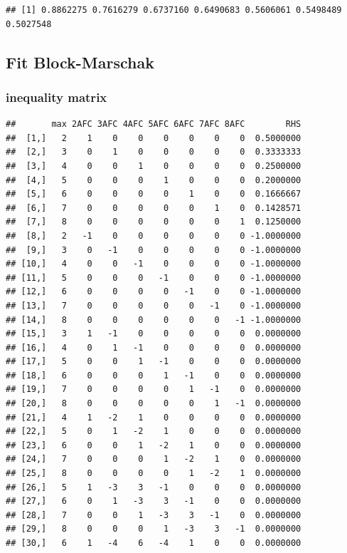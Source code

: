 \documentclass[]{article}
\begin{document}
\begin{verbatim}
## [1] 0.8862275 0.7616279 0.6737160 0.6490683 0.5606061 0.5498489 0.5027548
\end{verbatim}

\subsection{Fit Block-Marschak}\label{fit-block-marschak}

\subsubsection{inequality matrix}\label{inequality-matrix}

\begin{verbatim}
##       max 2AFC 3AFC 4AFC 5AFC 6AFC 7AFC 8AFC        RHS
##  [1,]   2    1    0    0    0    0    0    0  0.5000000
##  [2,]   3    0    1    0    0    0    0    0  0.3333333
##  [3,]   4    0    0    1    0    0    0    0  0.2500000
##  [4,]   5    0    0    0    1    0    0    0  0.2000000
##  [5,]   6    0    0    0    0    1    0    0  0.1666667
##  [6,]   7    0    0    0    0    0    1    0  0.1428571
##  [7,]   8    0    0    0    0    0    0    1  0.1250000
##  [8,]   2   -1    0    0    0    0    0    0 -1.0000000
##  [9,]   3    0   -1    0    0    0    0    0 -1.0000000
## [10,]   4    0    0   -1    0    0    0    0 -1.0000000
## [11,]   5    0    0    0   -1    0    0    0 -1.0000000
## [12,]   6    0    0    0    0   -1    0    0 -1.0000000
## [13,]   7    0    0    0    0    0   -1    0 -1.0000000
## [14,]   8    0    0    0    0    0    0   -1 -1.0000000
## [15,]   3    1   -1    0    0    0    0    0  0.0000000
## [16,]   4    0    1   -1    0    0    0    0  0.0000000
## [17,]   5    0    0    1   -1    0    0    0  0.0000000
## [18,]   6    0    0    0    1   -1    0    0  0.0000000
## [19,]   7    0    0    0    0    1   -1    0  0.0000000
## [20,]   8    0    0    0    0    0    1   -1  0.0000000
## [21,]   4    1   -2    1    0    0    0    0  0.0000000
## [22,]   5    0    1   -2    1    0    0    0  0.0000000
## [23,]   6    0    0    1   -2    1    0    0  0.0000000
## [24,]   7    0    0    0    1   -2    1    0  0.0000000
## [25,]   8    0    0    0    0    1   -2    1  0.0000000
## [26,]   5    1   -3    3   -1    0    0    0  0.0000000
## [27,]   6    0    1   -3    3   -1    0    0  0.0000000
## [28,]   7    0    0    1   -3    3   -1    0  0.0000000
## [29,]   8    0    0    0    1   -3    3   -1  0.0000000
## [30,]   6    1   -4    6   -4    1    0    0  0.0000000

\end{verbatim}
\end{document}
